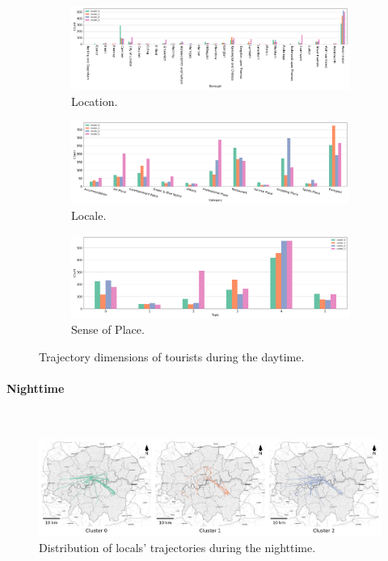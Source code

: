 \documentclass{article}
\newcommand{\subsubsubsection}[1]{\paragraph{#1}\mbox{}\\}
\theoremstyle{definition}
\theoremstyle{remark}
\begin{document}
\begin{figure}[!h]

\centering
\begin{subfigure}{0.6\textheight}
\centering
\includegraphics[width=1\linewidth]{figures/traj_location_daytime_tourists.png}
\caption{Location.}
\label{fig:traj_location_daytime_tourists}
\end{subfigure}
\begin{subfigure}{0.6\textheight}
\centering
\includegraphics[width=1\linewidth]{figures/traj_locale_daytime_tourists.png}
\caption{Locale.}
\label{fig:traj_locale_daytime_tourists}
\end{subfigure}
\begin{subfigure}{0.6\textheight}
\centering
\includegraphics[width=1\linewidth]{figures/traj_sense_daytime_tourists.png}
\caption{Sense of Place.}
\label{fig:traj_sense_daytime_tourists}
\end{subfigure}

\caption{Trajectory dimensions of tourists during the daytime.}
\label{fig:traj_dimension_daytime_tourists}
\end{figure}

\subsubsubsection{Nighttime}

\begin{figure}[!h]
\centering
\includegraphics[width=1\textwidth]{figures/traj_distribution_nighttime_locals.png}
\caption{\label{fig:traj_distribution_nighttime_locals}Distribution of locals' trajectories during the nighttime.}
\end{figure}
\end{document}
